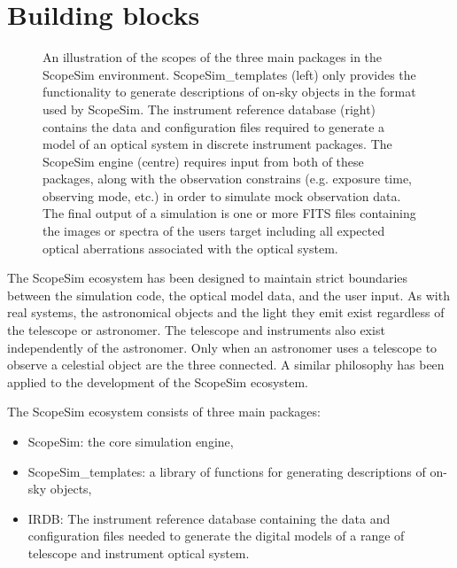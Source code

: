 

\section{Building blocks%
  \label{building-blocks}%
}

\begin{figure}
\noindent{}\label{fig-ecosystem}

\caption{An illustration of the scopes of the three main packages in the ScopeSim environment.
ScopeSim\_templates (left) only provides the functionality to generate descriptions of on-sky objects in the format used by ScopeSim.
The instrument reference database (right) contains the data and configuration files required to generate a model of an optical system in discrete instrument packages.
The ScopeSim engine (centre) requires input from both of these packages, along with the observation constrains (e.g. exposure time, observing mode, etc.) in order to simulate mock observation data.
The final output of a simulation is one or more FITS files containing the images or spectra of the users  target including all expected optical aberrations associated with the optical system.}
\end{figure}

The ScopeSim ecosystem has been designed to maintain strict boundaries between the simulation code, the optical model data, and the user input.
As with real systems, the astronomical objects and the light they emit exist regardless of the telescope or astronomer.
The telescope and instruments also exist independently of the astronomer.
Only when an astronomer uses a telescope to observe a celestial object are the three connected.
A similar philosophy has been applied to the development of the ScopeSim ecosystem.

The ScopeSim ecosystem consists of three main packages:

\begin{itemize}
\item ScopeSim: the core simulation engine,

\item ScopeSim\_templates: a library of functions for generating descriptions of on-sky objects,

\item IRDB: The instrument reference database containing the data and configuration files needed to generate the digital models of a range of telescope and instrument optical system.
\end{itemize}

